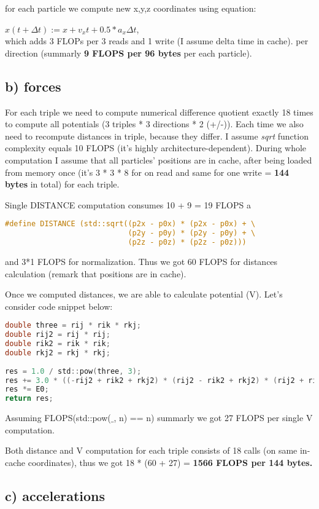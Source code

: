 \documentclass[12pt]{article}
\begin{document}
for each particle we compute new x,y,z coordinates using equation:

$x(t + \Delta t) := x + v_x t + 0.5*a_x \Delta t$,\\
which adds 3 FLOPs per 3 reads and 1 write (I assume delta time in cache). per direction (summarly \textbf{9 FLOPS per 96 bytes} per each particle).

\subsection*{b) forces}
For each triple we need to compute numerical difference quotient exactly 18 times to compute all potentials (3 triples * 3 directions * 2 (+/-)). Each time we also need to recompute distances in triple, because they differ. I assume \textit{sqrt} function complexity equals 10 FLOPS (it's highly architecture-dependent). During whole computation I assume that all particles' positions are in cache, after being loaded from memory once (it's 3 * 3 * 8 for on read and same for one write = \textbf{144 bytes} in total) for each triple.

Single DISTANCE computation consumes 10 + 9 = 19 FLOPS a 
\begin{lstlisting}[language=C]
   #define DISTANCE (std::sqrt((p2x - p0x) * (p2x - p0x) + \
                            (p2y - p0y) * (p2y - p0y) + \
                            (p2z - p0z) * (p2z - p0z)))
\end{lstlisting}
and 3*1 FLOPS for normalization.
Thus we got 60 FLOPS for distances calculation (remark that positions are in cache).

Once we computed distances, we are able to calculate potential (V). Let's consider code snippet below:
\begin{lstlisting}[language=C]
double three = rij * rik * rkj;
double rij2 = rij * rij;
double rik2 = rik * rik;
double rkj2 = rkj * rkj;
    
res = 1.0 / std::pow(three, 3);
res += 3.0 * ((-rij2 + rik2 + rkj2) * (rij2 - rik2 + rkj2) * (rij2 + rik2 - rkj2)) / (8.0 * std::pow(three, 5));
res *= E0;
return res;
\end{lstlisting}
Assuming FLOPS(std::pow($\_$, n) == n) summarly we got 27 FLOPS per single V computation.

Both distance and V computation for each triple consists of 18 calls (on same in-cache coordinates), thus we got 18 * (60 + 27) = \textbf{1566 FLOPS per 144 bytes.}

\subsection*{c) accelerations}
\end{document}
